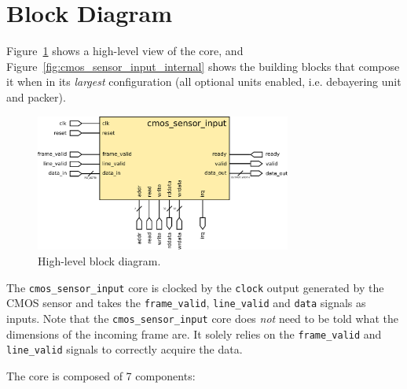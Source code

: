 \documentclass{article}
\def \cmossensorinput {\texttt{cmos\_sensor\_input} }
\begin{document}
\newpage

\section{Block Diagram}
Figure~\ref{fig:cmos_sensor_input_external} shows a high-level view of the core, and Figure~\ref{fig:cmos_sensor_input_internal} shows the building blocks that compose it when in its \emph{largest} configuration (all optional units enabled, i.e. debayering unit and packer).

\begin{figure}[h]
    \centering
    \includegraphics[width=0.75\textwidth]{fig/cmos_sensor_input_external}
    \caption{High-level block diagram.}
    \label{fig:cmos_sensor_input_external}
\end{figure}

The \cmossensorinput core is clocked by the \texttt{clock} output generated by the CMOS sensor and takes the \texttt{frame\_valid}, \texttt{line\_valid} and \texttt{data} signals as inputs.
Note that the \cmossensorinput core does \emph{not} need to be told what the dimensions of the incoming frame are. It solely relies on the \texttt{frame\_valid} and \texttt{line\_valid} signals to correctly acquire the data.

The core is composed of 7 components:
\end{document}
